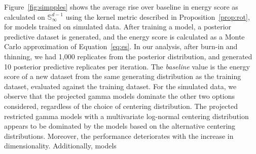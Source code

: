 Figure~\ref{fig:simpples} shows the average rise over baseline in energy score as
    calculated on $\mathbb{S}_{\infty}^{d-1}$ using the kernel metric described
    in Proposition~\ref{prop:rot}, for models trained on simulated data.  After training
    a model, a posterior predictive dataset is generated, and the energy score is
    calculated as a Monte Carlo approximation of Equation~\eqref{eq:es}.  In our analysis,
    after burn-in and thinning, we had 1,000 replicates from the posterior distribution, and
    generated 10 posterior predictive replicates per iteration.
    The \emph{baseline} value is the energy score of a new dataset from the same
    generating distribution as the training dataset, evaluated against the training 
    dataset.  
    For the simulated data, we observe that the projected gamma models dominate the other two
    options considered, regardless of the choice of centering distribution.  The projected 
    restricted gamma models with a multivariate log-normal centering distribution appears to 
    be dominated by the models based on the alternative centering distributions. Moreover, the
    performance deteriorates with the increase in dimensionality. Additionally, models
